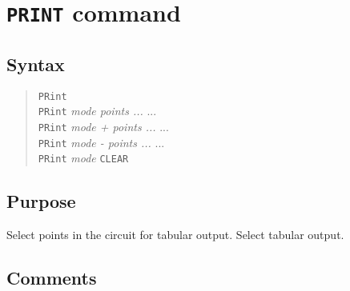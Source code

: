 %
%
%
%
\section{{\tt PRINT} command}
\subsection{Syntax}
\begin{verse}
{\tt PRint}\\
{\tt PRint} {\it mode points ...} ...\\
{\tt PRint} {\it mode + points ...} ...\\
{\tt PRint} {\it mode - points ...} ...\\
{\tt PRint} {\it mode} {\tt CLEAR}
\end{verse}
\subsection{Purpose}

Select points in the circuit for tabular output.  Select tabular output.
\subsection{Comments}


